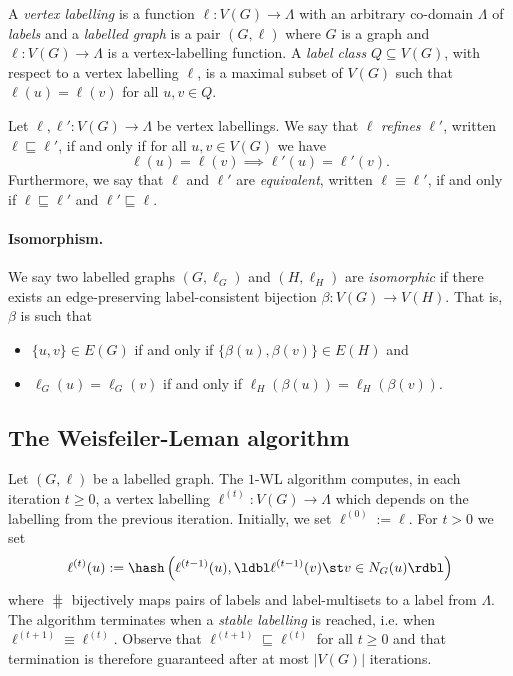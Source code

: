 A \emph{vertex labelling} is a function $\ell: V(G) \to \Lambda$ with an
arbitrary co-domain $\Lambda$ of \emph{labels} and a \emph{labelled
graph} is a pair $(G,\ell)$ where $G$ is a graph and $\ell : V(G) \to \Lambda$
is a vertex-labelling function. A \emph{label class} $Q \subseteq V(G)$, with
respect to a vertex labelling $\ell$, is a maximal subset of $V(G)$ such that
$\ell(u) = \ell(v)$ for all $u,v \in Q$.

Let $\ell,\ell' : V(G) \to \Lambda$ be vertex labellings.
We say that $\ell$ \emph{refines} $\ell'$, written $\ell \sqsubseteq \ell'$,
if and only if for all $u,v \in V(G)$ we have
\[
    \ell(u) = \ell(v) \implies \ell'(u) = \ell'(v).
\]
Furthermore, we say that $\ell$ and $\ell'$ are \emph{equivalent}, written
$\ell \equiv \ell'$, if and only if $\ell \sqsubseteq \ell'$
and $\ell' \sqsubseteq \ell$. 

\paragraph{Isomorphism.}
We say two labelled graphs $(G,\ell_G)$ and $(H,\ell_H)$ are \emph{isomorphic}
if there exists an edge-preserving label-consistent bijection $\beta : V(G)
\to V(H)$. That is, $\beta$ is such that 
\begin{itemize}
    \item $\{u,v\} \in E(G)$ if and only if $\{\beta(u),\beta(v)\} \in E(H)$ and
    \item $\ell_G(u) = \ell_G(v)$
      if and only if $\ell_H(\beta(u)) = \ell_H(\beta(v))$.
\end{itemize}



\subsection{The Weisfeiler-Leman algorithm}
Let $(G,\ell)$ be a labelled graph. The $1$-WL algorithm computes, in each
iteration $t \geq 0$, a vertex labelling $\ell^{(t)} : V(G) \to \Lambda$ which
depends on the labelling from the previous iteration. Initially, we set
$\ell^{(0)} := \ell$. For $t > 0$ we set
\[
   \ell^{(t)}(u) := 
    \hash\left(\ell^{(t-1)}(u), \ldbl \ell^{(t-1)}(v) \st v \in N_G(u) \rdbl\right)
\]
where $\hash$ bijectively maps pairs of labels and label-multisets to a label
from $\Lambda$.  The algorithm terminates when a \emph{stable labelling} is
reached, i.e. when $\ell^{(t+1)} \equiv \ell^{(t)}$. Observe that
$\ell^{(t+1)} \sqsubseteq \ell^{(t)}$ for all $t \geq 0$ and that termination
is therefore guaranteed after at most $|V(G)|$ iterations.

